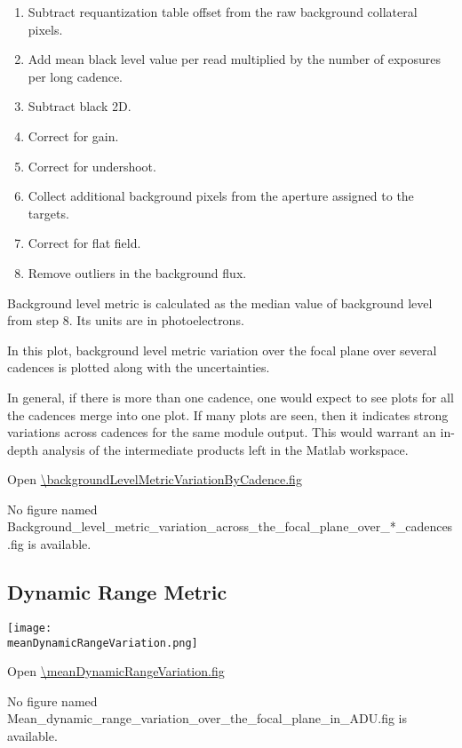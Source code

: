 \begin{enumerate}
\item 
  Subtract requantization table offset from the raw background
  collateral pixels.
\item 
  Add mean black level value per read multiplied by the number of
  exposures per long cadence.
\item 
  Subtract black 2D.
\item 
  Correct for gain.
\item 
  Correct for undershoot.
\item 
  Collect additional background pixels from the aperture assigned to the
  targets.
\item 
  Correct for flat field.
\item 
  Remove outliers in the background flux.
\end{enumerate}

Background level metric is calculated as the median value of
background level from step 8. Its units are in photoelectrons.

In this plot, background level metric variation over the focal plane
over several cadences is plotted along with the uncertainties.

In general, if there is more than one cadence, one would expect to see
plots for all the cadences merge into one plot. If many plots are
seen, then it indicates strong variations across cadences for the same
module output. This would warrant an in-depth analysis of the
intermediate products left in the Matlab workspace.

Open \url{\backgroundLevelMetricVariationByCadence.fig}

\else
No figure named
Background\_level\_metric\_variation\_across\_the\_focal\_plane\_over\_*\_cadences.fig is
available.
\fi
\clearpage

\subsection{Dynamic Range Metric}

\ifdefined \meanDynamicRangeVariation

\begin{center}
  \texttt{[image: \\meanDynamicRangeVariation.png]}
\end{center}

\meanDynamicRangeVariationCaption

Open \url{\meanDynamicRangeVariation.fig}

\else
No figure named
Mean\_dynamic\_range\_variation\_over\_the\_focal\_plane\_in\_ADU.fig is
available.
\fi
\clearpage

